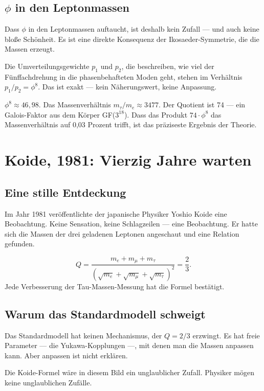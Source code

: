 \documentclass[12pt,oneside]{book}
\begin{document}
\section{$\phi$ in den Leptonmassen}

Dass $\phi$ in den Leptonmassen auftaucht, ist deshalb kein Zufall — und auch keine bloße Schönheit. Es ist eine direkte Konsequenz der Ikosaeder-Symmetrie, die die Massen erzeugt.

Die Umverteilungsgewichte $p_1$ und $p_2$, die beschreiben, wie viel der Fünffachdrehung in die phasenbehafteten Moden geht, stehen im Verhältnis $p_1/p_2 = \phi^8$. Das ist exakt — kein Näherungswert, keine Anpassung.

$\phi^8 \approx 46{,}98$. Das Massenverhältnis $m_\tau / m_e \approx 3477$. Der Quotient ist 74 — ein Galois-Faktor aus dem Körper GF($3^{18}$). Dass das Produkt $74 \cdot \phi^8$ das Massenverhältnis auf 0,03 Prozent trifft, ist das präziseste Ergebnis der Theorie.

\chapter{Koide, 1981: Vierzig Jahre warten}

\section{Eine stille Entdeckung}

Im Jahr 1981 veröffentlichte der japanische Physiker Yoshio Koide eine Beobachtung. Keine Sensation, keine Schlagzeilen — eine Beobachtung. Er hatte sich die Massen der drei geladenen Leptonen angeschaut und eine Relation gefunden.

\begin{merkbox}
\[
Q = \frac{m_e + m_\mu + m_\tau}{(\sqrt{m_e} + \sqrt{m_\mu} + \sqrt{m_\tau})^2} = \frac{2}{3}.
\]
Jede Verbesserung der Tau-Massen-Messung hat die Formel bestätigt.
\end{merkbox}

\section{Warum das Standardmodell schweigt}

Das Standardmodell hat keinen Mechanismus, der $Q = 2/3$ erzwingt. Es hat freie Parameter — die Yukawa-Kopplungen —, mit denen man die Massen anpassen kann. Aber anpassen ist nicht erklären.

Die Koide-Formel wäre in diesem Bild ein unglaublicher Zufall. Physiker mögen keine unglaublichen Zufälle.
\end{document}
